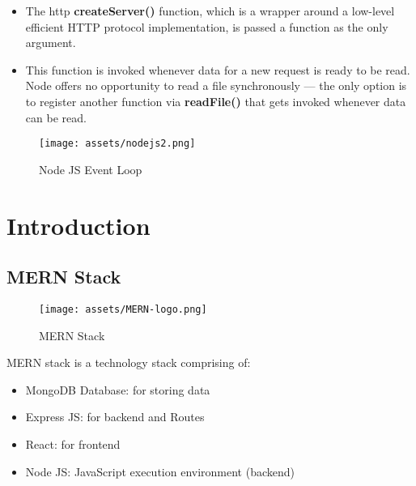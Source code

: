 \documentclass[12pt]{article}
\begin{document}

\begin{itemize}[noitemsep]
  \itemsep0.5em
  
  \item The http \textbf{createServer()} function, which is a wrapper around a low-level efficient HTTP protocol implementation, is passed a function as the only argument. 

  \item This function is invoked whenever data for a new request is ready to be read. Node offers no opportunity to read a file synchronously — the only option is to register another function via \textbf{readFile()} that gets invoked whenever data can be read.


  
\end{itemize}



\begin{figure}[H]
    \centering
    \texttt{[image: assets/nodejs2.png]}
    \caption{Node JS Event Loop}
    \label{fig:logo}
\end{figure}









\section{Introduction}
\subsection{MERN Stack}
\vspace{1cm}
\begin{figure}[H]
    \centering
    \texttt{[image: assets/MERN-logo.png]}
    \caption{MERN Stack}
    \label{fig:logo}
\end{figure}


MERN stack is a technology stack comprising of:
\begin{itemize}[noitemsep]
  \itemsep0.5em
  
  \item MongoDB Database: for storing data
  \item Express JS: for backend and Routes
  \item React: for frontend
  \item Node JS: JavaScript execution environment (backend)
  
\end{itemize}
\end{document}
